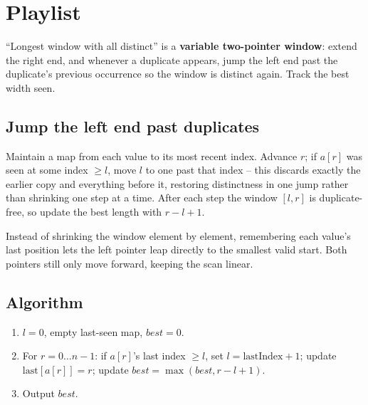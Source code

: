 \section{Playlist}
\label{sec:cses-playlist}


\begin{patternbox}
``Longest window with all distinct'' is a \textbf{variable two-pointer
window}: extend the right end, and whenever a duplicate appears, jump the
left end past the duplicate's previous occurrence so the window is distinct
again. Track the best width seen.
\end{patternbox}

\subsection*{Jump the left end past duplicates}

Maintain a map from each value to its most recent index. Advance $r$; if
$a[r]$ was seen at some index $\ge l$, move $l$ to one past that index --
this discards exactly the earlier copy and everything before it, restoring
distinctness in one jump rather than shrinking one step at a time. After
each step the window $[l,r]$ is duplicate-free, so update the best length
with $r-l+1$.

\begin{ideabox}
Instead of shrinking the window element by element, remembering each value's
last position lets the left pointer leap directly to the smallest valid
start. Both pointers still only move forward, keeping the scan linear.
\end{ideabox}

\subsection*{Algorithm}

\begin{enumerate}
  \item $l=0$, empty last-seen map, $\textit{best}=0$.
  \item For $r=0\ldots n-1$: if $a[r]$'s last index $\ge l$, set
        $l=\text{lastIndex}+1$; update $\text{last}[a[r]]=r$; update
        $\textit{best}=\max(\textit{best},r-l+1)$.
  \item Output $\textit{best}$.
\end{enumerate}

